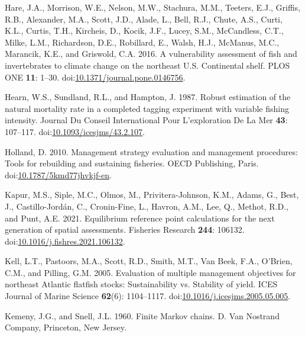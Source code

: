 \documentclass[
]{article}
\newlength{\cslhangindent}
\newlength{\cslentryspacingunit} %
\newenvironment{CSLReferences}[2] %
 {%
  \setlength{\parindent}{0pt}
  \ifodd #1
  \let\oldpar\par
  \def\par{\hangindent=\cslhangindent\oldpar}
  \fi
  \setlength{\parskip}{#2\cslentryspacingunit}
 }%
 {}
\begin{document}
\begin{CSLReferences}{1}{0}
\leavevmode{}%
Hare, J.A., Morrison, W.E., Nelson, M.W., Stachura, M.M., Teeters, E.J., Griffis, R.B., Alexander, M.A., Scott, J.D., Alade, L., Bell, R.J., Chute, A.S., Curti, K.L., Curtis, T.H., Kircheis, D., Kocik, J.F., Lucey, S.M., McCandless, C.T., Milke, L.M., Richardson, D.E., Robillard, E., Walsh, H.J., McManus, M.C., Marancik, K.E., and Griswold, C.A. 2016. A vulnerability assessment of fish and invertebrates to climate change on the northeast {U}.{S}. Continental shelf. PLOS ONE \textbf{11}: 1--30. doi:\href{https://doi.org/10.1371/journal.pone.0146756}{10.1371/journal.pone.0146756}.

\leavevmode{}%
Hearn, W.S., Sundland, R.L., and Hampton, J. 1987. Robust estimation of the natural mortality rate in a completed tagging experiment with variable fishing intensity. Journal Du Conseil International Pour L'exploration De La Mer \textbf{43}: 107--117. doi:\href{https://doi.org/10.1093/icesjms/43.2.107}{10.1093/icesjms/43.2.107}.

\leavevmode{}%
Holland, D. 2010. Management strategy evaluation and management procedures: Tools for rebuilding and sustaining fisheries. OECD Publishing, Paris. doi:\href{https://doi.org/10.1787/5kmd77jhvkjf-en}{10.1787/5kmd77jhvkjf-en}.

\leavevmode{}%
Kapur, M.S., Siple, M.C., Olmos, M., Privitera-Johnson, K.M., Adams, G., Best, J., Castillo-Jordán, C., Cronin-Fine, L., Havron, A.M., Lee, Q., Methot, R.D., and Punt, A.E. 2021. Equilibrium reference point calculations for the next generation of spatial assessments. Fisheries Research \textbf{244}: 106132. doi:\href{https://doi.org/10.1016/j.fishres.2021.106132}{10.1016/j.fishres.2021.106132}.

\leavevmode{}%
Kell, L.T., Pastoors, M.A., Scott, R.D., Smith, M.T., Van Beek, F.A., O'Brien, C.M., and Pilling, G.M. 2005. Evaluation of multiple management objectives for northeast {A}tlantic flatfish stocks: Sustainability vs. Stability of yield. ICES Journal of Marine Science \textbf{62}(6): 1104--1117. doi:\href{https://doi.org/10.1016/j.icesjms.2005.05.005}{10.1016/j.icesjms.2005.05.005}.

\leavevmode{}%
Kemeny, J.G., and Snell, J.L. 1960. Finite {M}arkov chains. D. Van Nostrand Company, Princeton, New Jersey.


\end{CSLReferences}
\end{document}
